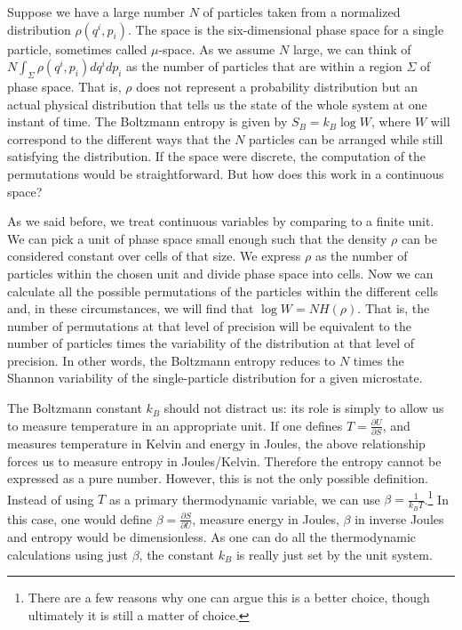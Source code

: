 \documentclass[iopart]{revtex4-1}
\begin{document}
Suppose we have a large number $N$ of particles taken from a normalized distribution $\rho(q^i, p_i)$. The space is the six-dimensional phase space for a single particle, sometimes called $\mu$-space. As we assume $N$ large, we can think of $N\int_\Sigma \rho(q^i, p_i)dq^idp_i$ as the number of particles that are within a region $\Sigma$ of phase space. That is, $\rho$ does not represent a probability distribution but an actual physical distribution that tells us the state of the whole system at one instant of time. The Boltzmann entropy is given by $S_B = k_B \log W$, where $W$ will correspond to the different ways that the $N$ particles can be arranged while still satisfying the distribution. If the space were discrete, the computation of the permutations would be straightforward. But how does this work in a continuous space?

As we said before, we treat continuous variables by comparing to a finite unit. We can pick a unit of phase space small enough such that the density $\rho$ can be considered constant over cells of that size. We express $\rho$ as the number of particles within the chosen unit and divide phase space into cells. Now we can calculate all the possible permutations of the particles within the different cells and, in these circumstances, we will find that $\log W = N H(\rho)$. That is, the number of permutations at that level of precision will be equivalent to the number of particles times the variability of the distribution at that level of precision. In other words, the Boltzmann entropy reduces to $N$ times the Shannon variability of the single-particle distribution for a given microstate.

The Boltzmann constant $k_B$ should not distract us: its role is simply to allow us to measure temperature in an appropriate unit. If one defines $T = \frac{\partial U}{\partial S}$, and measures temperature in Kelvin and energy in Joules, the above relationship forces us to measure entropy in Joules/Kelvin. Therefore the entropy cannot be expressed as a pure number. However, this is not the only possible definition. Instead of using $T$ as a primary thermodynamic variable, we can use $\beta = \frac{1}{k_B T}$.\footnote{There are a few reasons why one can argue this is a better choice, though ultimately it is still a matter of choice.} In this case, one would define $\beta = \frac{\partial S}{\partial U}$, measure energy in Joules, $\beta$ in inverse Joules and entropy would be dimensionless. As one can do all the thermodynamic calculations using just $\beta$, the constant $k_B$ is really just set by the unit system.
\end{document}

